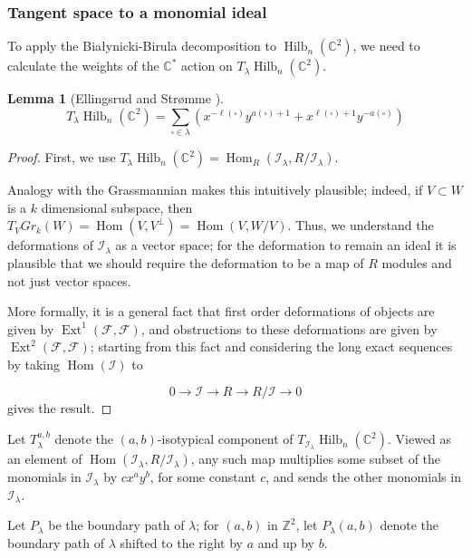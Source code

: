 \documentclass{amsart}[12pt]
\theoremstyle{definition}
\newtheorem{lemma}[dummy]{Lemma}
\newcommand{\Z}{\mathbb{Z}}
\newcommand{\C}{\mathbb{C}}
\DeclareMathOperator{\Hilb}{Hilb}
\DeclareMathOperator{\Ext}{Ext}
\DeclareMathOperator{\Hom}{Hom}
\begin{document}
\subsubsection{Tangent space to a monomial ideal}
To apply the Bia\l ynicki-Birula decomposition to $\Hilb_n(\C^2)$, we need to calculate the weights of the $\C^*$ action on $T_\lambda\Hilb_n(\C^2)$.

\begin{lemma}[Ellingsrud and Str\o mme \cite{ES}] \label{lem:torus-weights}
$$T_\lambda \Hilb_n(\C^2)=\sum_{\square\in\lambda} \left(x^{-\ell(\square)} y^{a(\square)+1}+x^{\ell(\square)+1}y^{-a(\square)}\right)$$
\end{lemma}

\begin{proof}



First, we use $T_\lambda\Hilb_n(\C^2)=\Hom_R(\mathcal{I}_\lambda,R/\mathcal{I}_\lambda)$.

Analogy with the Grassmannian makes this intuitively plausible; indeed, if $V\subset W$ is a $k$ dimensional subspace, then $T_V Gr_k(W)=\Hom(V, V^\perp)=\Hom(V, W/V)$.  Thus, we understand the deformations of $\mathcal{I}_\lambda$ as a vector space; for the deformation to remain an ideal it is plausible that we should require the deformation to be a map of $R$ modules and not just vector spaces.

More formally, it is a general fact that first order deformations of objects are given by $\Ext^1(\mathcal{F},\mathcal{F})$, and obstructions to these deformations are given by $\Ext^2(\mathcal{F},\mathcal{F})$; starting from this fact and considering the long exact sequences by taking $\Hom(\mathcal{I})$ to

$$0\to \mathcal{I}\to R\to R/\mathcal{I}\to 0$$
gives the result.

\end{proof}


Let $T_\lambda^{a,b}$ denote the $(a,b)$-isotypical component of $T_{\mathcal{I}_\lambda}\Hilb_n(\C^2)$.  Viewed as an element of $\Hom(\mathcal{I}_\lambda, R/\mathcal{I}_\lambda)$, any such map multiplies some subset of the monomials in $\mathcal{I}_\lambda$ by $cx^a y^b$, for some constant $c$, and sends the other monomials in $\mathcal{I}_\lambda$.  

Let $P_\lambda$ be the boundary path of $\lambda$; for $(a,b)$ in $\Z^2$, let $P_\lambda(a,b)$ denote the boundary path of $\lambda$ shifted to the right by $a$ and up by $b$.
\end{document}
